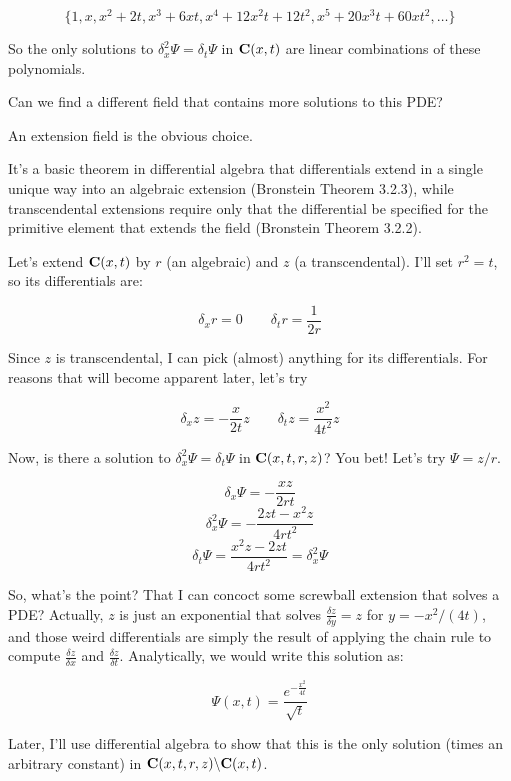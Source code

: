 \documentclass{article}
\newcommand{\C}{\ensuremath{{\bf C}}}
\begin{document}
%
%

$$\{1, x, x^2 + 2t, x^3 + 6xt, x^4 + 12 x^2t + 12 t^2, x^5+20x^3t+60xt^2, \ldots\}$$

So the only solutions to $\delta_x^2 \Psi = \delta_t \Psi$ in
$\C(x,t)$ are linear combinations of these polynomials.

Can we find a different field that contains more solutions to this PDE?

An extension field is the obvious choice.

It's a basic theorem in differential algebra that differentials extend
in a single unique way into an algebraic extension (Bronstein Theorem
3.2.3), while transcendental extensions require only that the
differential be specified for the primitive element that extends the
field (Bronstein Theorem 3.2.2).

Let's extend $\C(x,t)$ by $r$ (an algebraic) and $z$ (a
transcendental).  I'll set $r^2 = t$, so its differentials are:

$$\delta_x r = 0 \qquad \delta_t r = \frac{1}{2r} $$


Since $z$ is transcendental, I can pick (almost) anything for its differentials.  For
reasons that will become apparent later, let's try

$$\delta_x z = -\frac{x}{2t} z \qquad \delta_t z = \frac{x^2}{4t^2} z$$

Now, is there a solution to $\delta_x^2 \Psi = \delta_t \Psi$ in
$\C(x,t,r,z)$?  You bet!  Let's try $\Psi = z/r$.

$$\delta_x \Psi = - \frac{xz}{2rt}$$
$$\delta_x^2 \Psi = - \frac{2zt-x^2z}{4rt^2}$$
$$\delta_t \Psi =  \frac{x^2z - 2zt}{4rt^2} = \delta_x^2 \Psi$$

So, what's the point?  That I can concoct some screwball extension
that solves a PDE?  Actually, $z$ is just an exponential that solves
$\frac{\delta z}{\delta y}=z$ for $y=-x^2/(4t)$, and those weird
differentials are simply the result of applying the chain rule
to compute $\frac{\delta z}{\delta x}$ and $\frac{\delta z}{\delta t}$.
Analytically, we would write this solution as:

$$\Psi(x,t) = \frac{e^{-\frac{x^2}{4t}}}{\sqrt{t}}$$

Later, I'll use differential algebra to show that this is the only
solution (times an arbitrary constant) in $\C(x,t,r,z) \backslash \C(x,t)$.
\end{document}
